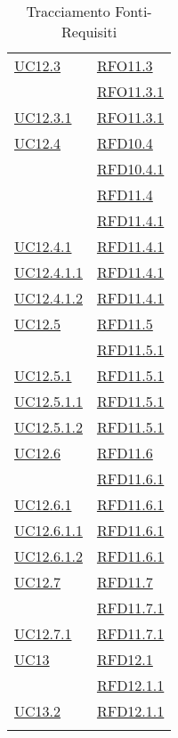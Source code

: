 \begin{longtable}{|>{\centering}m{5cm}|m{5cm}<{\centering}|}
\hyperref[UC12.3]{UC12.3} & \hyperlink{RFO11.3}{RFO11.3}\\
& \hyperlink{RFO11.3.1}{RFO11.3.1}\\ \hline
\hyperref[UC12.3.1]{UC12.3.1} & \hyperlink{RFO11.3.1}{RFO11.3.1}\\ \hline
\hyperref[UC12.4]{UC12.4} & \hyperlink{RFD10.4}{RFD10.4}\\
& \hyperlink{RFD10.4.1}{RFD10.4.1}\\
& \hyperlink{RFD11.4}{RFD11.4}\\
& \hyperlink{RFD11.4.1}{RFD11.4.1}\\ \hline
\hyperref[UC12.4.1]{UC12.4.1} & \hyperlink{RFD11.4.1}{RFD11.4.1}\\ \hline
\hyperref[UC12.4.1.1]{UC12.4.1.1} & \hyperlink{RFD11.4.1}{RFD11.4.1}\\ \hline
\hyperref[UC12.4.1.2]{UC12.4.1.2} & \hyperlink{RFD11.4.1}{RFD11.4.1}\\ \hline
\hyperref[UC12.5]{UC12.5} & \hyperlink{RFD11.5}{RFD11.5}\\
& \hyperlink{RFD11.5.1}{RFD11.5.1}\\ \hline
\hyperref[UC12.5.1]{UC12.5.1} & \hyperlink{RFD11.5.1}{RFD11.5.1}\\ \hline
\hyperref[UC12.5.1.1]{UC12.5.1.1} & \hyperlink{RFD11.5.1}{RFD11.5.1}\\ \hline
\hyperref[UC12.5.1.2]{UC12.5.1.2} & \hyperlink{RFD11.5.1}{RFD11.5.1}\\ \hline
\hyperref[UC12.6]{UC12.6} & \hyperlink{RFD11.6}{RFD11.6}\\
& \hyperlink{RFD11.6.1}{RFD11.6.1}\\ \hline
\hyperref[UC12.6.1]{UC12.6.1} & \hyperlink{RFD11.6.1}{RFD11.6.1}\\ \hline
\hyperref[UC12.6.1.1]{UC12.6.1.1} & \hyperlink{RFD11.6.1}{RFD11.6.1}\\ \hline
\hyperref[UC12.6.1.2]{UC12.6.1.2} & \hyperlink{RFD11.6.1}{RFD11.6.1}\\ \hline
\hyperref[UC12.7]{UC12.7} & \hyperlink{RFD11.7}{RFD11.7}\\
& \hyperlink{RFD11.7.1}{RFD11.7.1}\\ \hline
\hyperref[UC12.7.1]{UC12.7.1} & \hyperlink{RFD11.7.1}{RFD11.7.1}\\ \hline
\hyperref[UC13]{UC13} & \hyperlink{RFD12.1}{RFD12.1}\\
& \hyperlink{RFD12.1.1}{RFD12.1.1}\\ \hline
\hyperref[UC13.2]{UC13.2} & \hyperlink{RFD12.1.1}{RFD12.1.1}\\ \hline
\caption[Tracciamento Fonti-Requisiti]{Tracciamento Fonti-Requisiti}
\label{tabella:fonti-requi}
\end{longtable}
\clearpage
